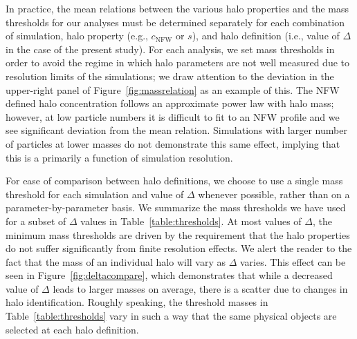 \documentclass[usenatbib,fleqn]{mnras}
\begin{document}
In practice, the mean relations between the various halo properties and the mass 
thresholds for our analyses must be determined separately for each combination of simulation, halo property (e.g., $c_{\mathrm{NFW}}$ or $s$), and halo definition (i.e., value of $\Delta$ in the case of the present study). For each analysis, we set mass thresholds in order to avoid the regime in which halo parameters are not well measured due to resolution limits of the simulations; we draw attention to the deviation in the upper-right panel of Figure~\ref{fig:massrelation} as an example of this. The NFW defined halo concentration follows an approximate power law with halo mass; however, at low particle numbers it is difficult to fit to an NFW profile and we see significant deviation from the mean relation. Simulations with larger number of particles at lower masses do not demonstrate this same effect, implying that this is a primarily a function of simulation resolution.

For ease of comparison between halo definitions, we choose to use a single mass threshold for each simulation and value of $\Delta$ whenever possible, rather than on a parameter-by-parameter basis. We summarize the mass thresholds we have used for a subset of $\Delta$ values in Table~\ref{table:thresholds}. 
At most values of $\Delta$, the minimum mass thresholds are 
driven by the requirement that the halo properties do 
not suffer significantly from finite resolution effects. We alert the reader to the fact that the mass of an individual halo will vary as $\Delta$ varies. This effect can be seen in Figure~\ref{fig:deltacompare}, which demonstrates that while a decreased value of $\Delta$ leads to larger masses on average, there is a scatter due to changes in halo identification. Roughly speaking, the threshold masses in Table~\ref{table:thresholds} vary in such a way that the 
same physical objects are selected at each halo definition.
\end{document}
